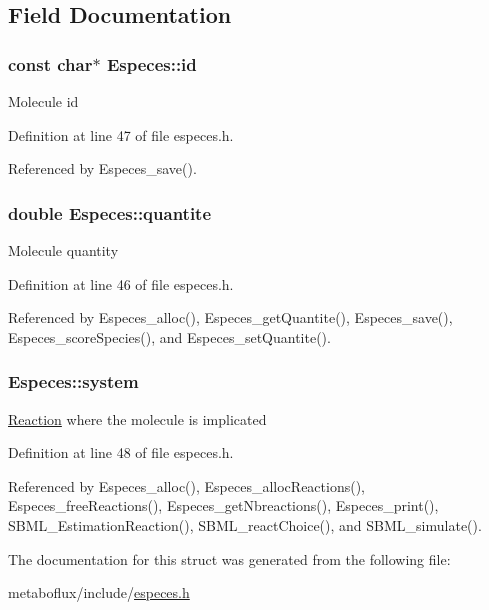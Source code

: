 \subsection{Field Documentation}
\hypertarget{structEspeces_a2fbe0a8da0e7c223e27f9bf40e48f170}{
\subsubsection[{id}]{\setlength{\rightskip}{0pt plus 5cm}const char$\ast$ {\bf Especes::id}}}
\label{structEspeces_a2fbe0a8da0e7c223e27f9bf40e48f170}
Molecule id 

Definition at line 47 of file especes.h.



Referenced by Especes\_\-save().

\hypertarget{structEspeces_ab4d42c5e3bcb897311b17030db5b882e}{
\subsubsection[{quantite}]{\setlength{\rightskip}{0pt plus 5cm}double {\bf Especes::quantite}}}
\label{structEspeces_ab4d42c5e3bcb897311b17030db5b882e}
Molecule quantity 

Definition at line 46 of file especes.h.



Referenced by Especes\_\-alloc(), Especes\_\-getQuantite(), Especes\_\-save(), Especes\_\-scoreSpecies(), and Especes\_\-setQuantite().

\hypertarget{structEspeces_a61d949a99599938950d1508d7cb86d4d}{
\subsubsection[{system}]{ {\bf Especes::system}}}
\label{structEspeces_a61d949a99599938950d1508d7cb86d4d}
\hyperlink{structReaction}{Reaction} where the molecule is implicated 

Definition at line 48 of file especes.h.



Referenced by Especes\_\-alloc(), Especes\_\-allocReactions(), Especes\_\-freeReactions(), Especes\_\-getNbreactions(), Especes\_\-print(), SBML\_\-EstimationReaction(), SBML\_\-reactChoice(), and SBML\_\-simulate().



The documentation for this struct was generated from the following file:\begin{DoxyCompactItemize}
\item 
metaboflux/include/\hyperlink{especes_8h}{especes.h}\end{DoxyCompactItemize}
